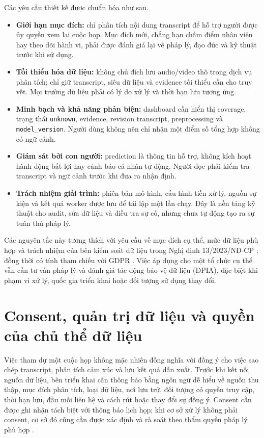 Các yêu cầu thiết kế được chuẩn hóa như sau.

\begin{itemize}
  \item \textbf{Giới hạn mục đích:} chỉ phân tích nội dung transcript để hỗ trợ người được ủy quyền xem lại cuộc họp. Mục đích mới, chẳng hạn chấm điểm nhân viên hay theo dõi hành vi, phải được đánh giá lại về pháp lý, đạo đức và kỹ thuật trước khi sử dụng.
  \item \textbf{Tối thiểu hóa dữ liệu:} không chủ đích lưu audio/video thô trong dịch vụ phân tích; chỉ giữ transcript, siêu dữ liệu và evidence tối thiểu cần cho truy vết. Mọi trường dữ liệu phải có lý do xử lý và thời hạn lưu tương ứng.
  \item \textbf{Minh bạch và khả năng phản biện:} dashboard cần hiển thị coverage, trạng thái \texttt{unknown}, evidence, revision transcript, preprocessing và \texttt{model\_version}. Người dùng không nên chỉ nhận một điểm số tổng hợp không có ngữ cảnh.
  \item \textbf{Giám sát bởi con người:} prediction là thông tin hỗ trợ, không kích hoạt hành động bất lợi hay cảnh báo cá nhân tự động. Người đọc phải kiểm tra transcript và ngữ cảnh trước khi đưa ra nhận định.
  \item \textbf{Trách nhiệm giải trình:} phiên bản mô hình, cấu hình tiền xử lý, nguồn sự kiện và kết quả worker được lưu để tái lập một lần chạy. Đây là nền tảng kỹ thuật cho audit, sửa dữ liệu và điều tra sự cố, nhưng chưa tự động tạo ra sự tuân thủ pháp lý.
\end{itemize}

Các nguyên tắc này tương thích với yêu cầu về mục đích cụ thể, mức dữ liệu phù hợp và trách nhiệm của bên kiểm soát dữ liệu trong Nghị định 13/2023/NĐ-CP \cite{decree132023}; đồng thời có tính tham chiếu với GDPR \cite{gdpr2016}. Việc áp dụng cho một tổ chức cụ thể vẫn cần tư vấn pháp lý và đánh giá tác động bảo vệ dữ liệu (DPIA), đặc biệt khi phạm vi xử lý, quốc gia triển khai hoặc đối tượng sử dụng thay đổi.

\section{Consent, quản trị dữ liệu và quyền của chủ thể dữ liệu}
Việc tham dự một cuộc họp không mặc nhiên đồng nghĩa với đồng ý cho việc sao chép transcript, phân tích cảm xúc và lưu kết quả dẫn xuất. Trước khi kết nối nguồn dữ liệu, bên triển khai cần thông báo bằng ngôn ngữ dễ hiểu về nguồn thu thập, mục đích phân tích, loại dữ liệu, nơi lưu trữ, đối tượng có quyền truy cập, thời hạn lưu, đầu mối liên hệ và cách rút hoặc thay đổi sự đồng ý. Consent cần được ghi nhận tách biệt với thông báo lịch họp; khi cơ sở xử lý không phải consent, cơ sở đó cũng cần được xác định và rà soát theo thẩm quyền pháp lý phù hợp \cite{decree132023}.

